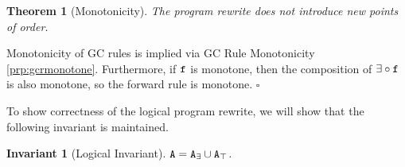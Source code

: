 \documentclass[10pt]{proc}
\newtheorem{thm}[theorem]{Theorem}
\newtheorem{invariant}[property]{Invariant}
\newenvironment{proof}[1][Proof]{\begin{trivlist}\item[\hskip \labelsep {\textit {#1:}}]}{\end{trivlist}}
\renewcommand{\tt}[1]{\ifmmode\text{\texttt{#1}}\else\texttt{#1}\fi}
\begin{document}
\begin{thm}[Monotonicity]
The program rewrite does not introduce new points of order.
\end{thm}
\begin{proof}
Monotonicity of GC rules is implied via GC Rule Monotonicity \ref{prp:gcrmonotone}.
Furthermore, if $\tt{f}$ is monotone, then the composition of $\exists \circ \tt{f}$ is also monotone, so the forward rule is monotone.
$\square$
\end{proof}

To show correctness of the logical program rewrite, we will show that the following invariant is maintained.
\begin{invariant}[Logical Invariant]\label{inv:logical}
$\tt{A} = \tt{A}_\exists \cup \tt{A}_\top$.
\end{invariant}
\end{document}
